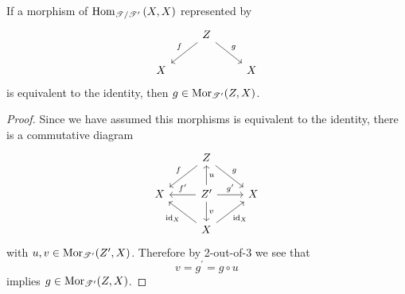\documentclass[dissertation.tex]{subfiles}
\begin{document}
\begin{lem}
  If a morphism of $\operatorname{Hom}_{\mathscr{T}/\mathscr{T}^\prime}\left(X,X\right)$ represented by
  $$\begin{tikzcd}
    & Z\arrow[swap]{ld}{f}\arrow{rd}{g}\\
    X & & X
  \end{tikzcd}$$
  is equivalent to the identity, then $g \in \operatorname{Mor}_{\mathscr{T}^\prime}(Z,X)$.
  
  \begin{proof}
    Since we have assumed this morphisms is equivalent to the identity, there is a commutative diagram
    $$\begin{tikzcd}
      & Z \arrow[swap]{ld}{f}\arrow{rd}{g}\\
      X & Z^\prime \arrow[swap]{l}{f^\prime}\arrow{r}{g^\prime}\arrow[swap]{u}{u}\arrow{d}{v} & X\\
      & X\arrow{ul}{\id_X}\arrow[swap]{ur}{\id_X}
    \end{tikzcd}$$
    with $u,v \in \operatorname{Mor}_{\mathscr{T}^\prime}(Z^\prime,X)$.
    Therefore by 2-out-of-3 we see that
    $$v = g^\prime = g \circ u$$
    implies $g \in \operatorname{Mor}_{\mathscr{T}^\prime}(Z,X)$.
  \end{proof}
\end{lem}
\end{document}
